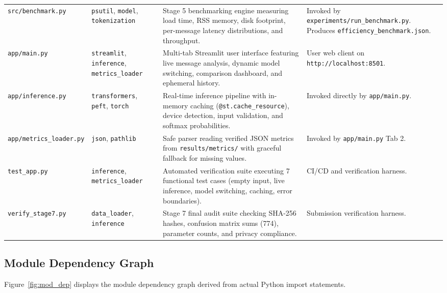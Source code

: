 \documentclass[conference]{IEEEtran}
\begin{document}
\begin{table}[htbp]
\begin{tabularx}{\textwidth}{l p{3.2cm} p{5.5cm} p{4.0cm}}
\addlinespace
\texttt{src/benchmark.py} & \texttt{psutil}, \texttt{model}, \texttt{tokenization} & Stage 5 benchmarking engine measuring load time, RSS memory, disk footprint, per-message latency distributions, and throughput. & Invoked by \texttt{experiments/run\_benchmark.py}. Produces \texttt{efficiency\_benchmark.json}. \\
\addlinespace
\texttt{app/main.py} & \texttt{streamlit}, \texttt{inference}, \texttt{metrics\_loader} & Multi-tab Streamlit user interface featuring live message analysis, dynamic model switching, comparison dashboard, and ephemeral history. & User web client on \texttt{http://localhost:8501}. \\
\addlinespace
\texttt{app/inference.py} & \texttt{transformers}, \texttt{peft}, \texttt{torch} & Real-time inference pipeline with in-memory caching (\texttt{@st.cache\_resource}), device detection, input validation, and softmax probabilities. & Invoked directly by \texttt{app/main.py}. \\
\addlinespace
\texttt{app/metrics\_loader.py} & \texttt{json}, \texttt{pathlib} & Safe parser reading verified JSON metrics from \texttt{results/metrics/} with graceful fallback for missing values. & Invoked by \texttt{app/main.py} Tab 2. \\
\addlinespace
\texttt{test\_app.py} & \texttt{inference}, \texttt{metrics\_loader} & Automated verification suite executing 7 functional test cases (empty input, live inference, model switching, caching, error boundaries). & CI/CD and verification harness. \\
\addlinespace
\texttt{verify\_stage7.py} & \texttt{data\_loader}, \texttt{inference} & Stage 7 final audit suite checking SHA-256 hashes, confusion matrix sums (774), parameter counts, and privacy compliance. & Submission verification harness. \\
\bottomrule
\end{tabularx}
\end{table}

\subsection{Module Dependency Graph}
Figure~\ref{fig:mod_dep} displays the module dependency graph derived from actual Python import statements.
\end{document}
